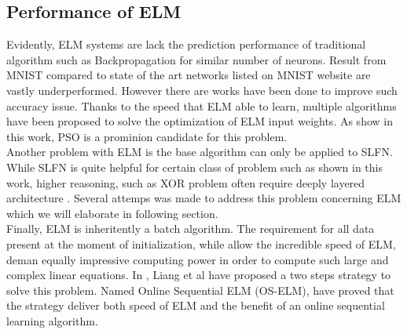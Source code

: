 \documentclass[13pt]{article}
\begin{document}
\subsection{Performance of ELM}
Evidently, ELM systems are lack the prediction performance of traditional algorithm such as Backpropagation for similar number of neurons. Result from MNIST \cite{lecun_gradient-based_1998} compared to state of the art networks listed on MNIST website are vastly underperformed. However there are works have been done to improve such accuracy issue. Thanks to the speed that ELM able to learn, multiple algorithms have been proposed to solve the optimization of ELM input weights. As show in this work, PSO is a prominion candidate for this problem.\\
Another problem with ELM is the base algorithm can only be applied to SLFN. While SLFN is quite helpful for certain class of problem such as shown in this work, higher reasoning, such as XOR problem often require deeply layered architecture \cite{newell_perceptrons._1969}. Several attemps was made to address this problem concerning ELM which we will elaborate in following section.\\
Finally, ELM is inheritently a batch algorithm. The requirement for all data present at the moment of initialization, while allow the incredible speed of ELM, deman equally impressive computing power in order to compute such large and complex linear equations. In \cite{nan-ying_liang_fast_2006}, Liang et al have proposed a two steps strategy to solve this problem. Named Online Sequential ELM (OS-ELM), \cite{nan-ying_liang_fast_2006} have proved that the strategy deliver both speed of ELM and the benefit of an online sequential learning algorithm.
\end{document}
